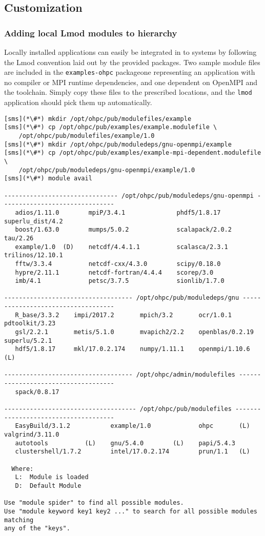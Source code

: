 \clearpage

\subsection{Customization} \label{appendix:customization}

\subsubsection{Adding local Lmod modules to \OHPC{} hierarchy} \label{appendix:modulefiles}
Locally installed applications can easily be integrated in to \OHPC{} systems by
following the Lmod convention laid out by the provided packages. Two sample
module files are included in the \texttt{examples-ohpc} package\textemdash one
representing an application with no compiler or MPI runtime dependencies, and
one dependent on OpenMPI and the \GNU{} toolchain. Simply copy these files to the
prescribed locations, and the \texttt{lmod} application should pick them up
automatically.

\begin{lstlisting}
[sms](*\#*) mkdir /opt/ohpc/pub/modulefiles/example
[sms](*\#*) cp /opt/ohpc/pub/examples/example.modulefile \
    /opt/ohpc/pub/modulefiles/example/1.0
[sms](*\#*) mkdir /opt/ohpc/pub/moduledeps/gnu-openmpi/example
[sms](*\#*) cp /opt/ohpc/pub/examples/example-mpi-dependent.modulefile \
    /opt/ohpc/pub/moduledeps/gnu-openmpi/example/1.0
[sms](*\#*) module avail

------------------------------- /opt/ohpc/pub/moduledeps/gnu-openmpi -------------------------------
   adios/1.11.0        mpiP/3.4.1              phdf5/1.8.17 superlu_dist/4.2
   boost/1.63.0        mumps/5.0.2             scalapack/2.0.2    tau/2.26
   example/1.0  (D)    netcdf/4.4.1.1          scalasca/2.3.1 trilinos/12.10.1
   fftw/3.3.4          netcdf-cxx/4.3.0        scipy/0.18.0
   hypre/2.11.1        netcdf-fortran/4.4.4    scorep/3.0
   imb/4.1             petsc/3.7.5             sionlib/1.7.0

----------------------------------- /opt/ohpc/pub/moduledeps/gnu -----------------------------------
   R_base/3.3.2    impi/2017.2       mpich/3.2       ocr/1.0.1 pdtoolkit/3.23
   gsl/2.2.1       metis/5.1.0       mvapich2/2.2    openblas/0.2.19 superlu/5.2.1
   hdf5/1.8.17     mkl/17.0.2.174    numpy/1.11.1    openmpi/1.10.6  (L)

----------------------------------- /opt/ohpc/admin/modulefiles ------------------------------------
   spack/0.8.17

------------------------------------ /opt/ohpc/pub/modulefiles -------------------------------------
   EasyBuild/3.1.2           example/1.0             ohpc       (L) valgrind/3.11.0
   autotools          (L)    gnu/5.4.0        (L)    papi/5.4.3
   clustershell/1.7.2        intel/17.0.2.174        prun/1.1   (L)

  Where:
   L:  Module is loaded
   D:  Default Module

Use "module spider" to find all possible modules.
Use "module keyword key1 key2 ..." to search for all possible modules matching
any of the "keys".
\end{lstlisting}

